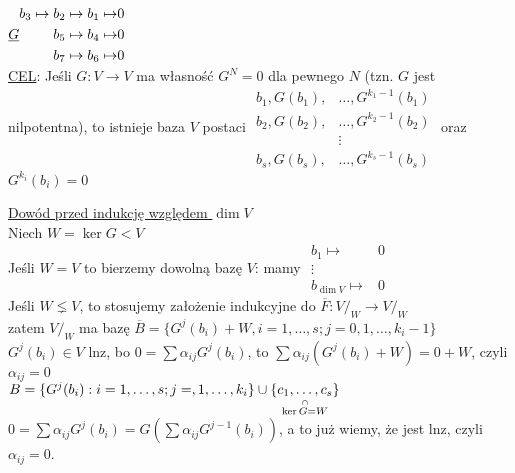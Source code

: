 $\underline G \\ 
\begin{aligned} 
    b_3 \mapsto b_2 \mapsto b_1 \mapsto &0 \\ 
    b_5 \mapsto b_4 \mapsto &0 \\ 
    b_7 \mapsto b_6 \mapsto &0 
\end{aligned} $ \\ 
\underline{CEL}: Jeśli $G: V \to V$ ma własność $G^N = 0$ dla pewnego $N$ (tzn. $G$ jest nilpotentna), to 
    istnieje baza $V$ postaci $\begin{aligned} b_1, G(b_1),&\ldots,G^{k_1 -1} (b_1) \\ 
                                               b_2, G(b_2),&\ldots,G^{k_2 -1} (b_2) \\
                                                            &\vdots \\
                                               b_s, G(b_s),&\ldots,G^{k_s -1} (b_s) \end{aligned}$
    oraz $G^{k_i} (b_i) = 0$

\underline{Dowód przed indukcję względem $\dim V$} \\ 
Niech $W = \ker G < V$ \\ 
Jeśli $W = V$ to bierzemy dowolną bazę $V$: mamy 
$\begin{aligned} b_1 \mapsto &0 \\ \vdots \\ b_{\dim V} \mapsto &0 \end{aligned} $ \\ 
Jeśli $W \lneq V$, to stosujemy założenie indukcyjne do $\overline F: V/_W \to V/_W$ \\ 
zatem $V /_W$ ma bazę $\overline B = \{G^j (b_i) + W, i = 1,\ldots,s; j = 0,1,\ldots,k_i-1 \}$ \\ 
$G^j (b_i) \in V$ lnz, bo $ 0 = \sum \alpha_{ij} G^j (b_i)$, to $\sum \alpha_{ij}(G^j(b_i) + W) = 0+W$, czyli 
$\alpha_{ij} = 0$ \\ 
$B = \{ G^j (b_i) : i = 1,\ldots,s; j = ,1,\ldots,k_i \} \cup \underscript{\{c_1,\ldots,c_s\}}{\cap}{\ker G = W}$
$0 = \sum \alpha_{ij} G^j (b_i) = G( \sum \alpha_{ij} G^{j-1} (b_i))$, a to już wiemy, że jest lnz, czyli $\alpha_{ij} = 0$.

